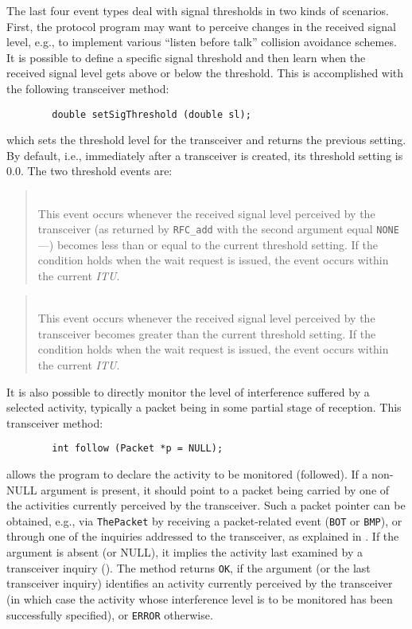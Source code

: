 The last four event types deal with signal thresholds in two kinds of
scenarios.
First, the protocol program may want to perceive changes in the received signal
level, e.g., to implement various ``listen before talk'' collision avoidance
schemes.
It is possible to define a specific signal threshold and then learn when the
received signal level gets above or below the threshold.
This is accomplished with the following transceiver method:
\begin{verbatim}
        double setSigThreshold (double sl);
\end{verbatim}
\noindent
which sets the threshold level for the transceiver and returns the previous
setting.
By default, i.e., immediately after a transceiver is created, its threshold
setting is 0.0.
The two threshold events are:

\begin{quote}
\noindent{}\\ \hspace{0in}
This event occurs whenever the received signal level perceived by the
transceiver (as returned by {\tt RFC\_add} with the second argument equal
{\tt NONE}---)
becomes less than or equal to the current threshold setting.
If the condition holds when the wait request is issued, the event occurs
within the current {\em ITU}.
\end{quote}

\begin{quote}
\noindent{}\\ \hspace{0in}
This event occurs whenever the received signal level perceived by the
transceiver becomes greater than the current threshold setting.
If the condition holds when the wait request is issued, the event occurs
within the current {\em ITU}.
\end{quote}

It is also possible to directly monitor the level of interference suffered by
a selected activity, typically a packet being in some partial stage of
reception.
This transceiver method:
\begin{verbatim}
        int follow (Packet *p = NULL);
\end{verbatim}
allows the program to declare the activity to be monitored (followed).
If a non-NULL argument is present, it should point to a packet being carried
by one of the activities currently perceived by the transceiver.
Such a packet pointer can be obtained, e.g., via {\tt ThePacket} by receiving
a packet-related event ({\tt BOT} or {\tt BMP}), or through one of the
inquiries addressed to the transceiver, as explained in .
If the argument is absent (or NULL), it implies the activity last
examined by a transceiver inquiry ().
The method returns {\tt OK}, if the argument (or the
last transceiver inquiry) identifies an activity currently perceived by
the transceiver (in which case the activity whose interference level is to
be monitored has been successfully specified), or {\tt ERROR} otherwise.

